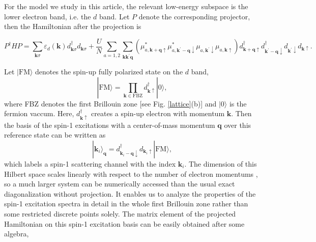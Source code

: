 \documentclass[amsmath,superscriptaddress,showpacs,aps,prb,twocolumn]{revtex4-1}
\begin{document}
\par For the model we study in this article, the relevant low-energy subspace is the lower electron band, i.e. the $d$ band. Let $P$ denote the corresponding projector, then the Hamiltonian after the projection is
\begin{widetext}
\begin{equation}
P^\dagger HP=\sum_{\mathbf{k}\sigma}\varepsilon_d(\mathbf{k})d^{\dagger}_{\mathbf{k}\sigma}d_{\mathbf{k}\sigma}
+\frac{U}{N}\sum_{a=1,2}\sum_{\mathbf{k}\mathbf{k}^{\prime}\mathbf{q}}
(\mu^{\ast}_{a,\mathbf{k}+\mathbf{q}\uparrow}\mu^{\ast}_{a,\mathbf{k}^{\prime}-\mathbf{q}\downarrow}\mu_{a,\mathbf{k}^{\prime}\downarrow}\mu_{a,\mathbf{k}\uparrow})
d^{\dagger}_{\mathbf{k}+\mathbf{q}\uparrow}d^{\dagger}_{\mathbf{k}^{\prime}-\mathbf{q}\downarrow}d_{\mathbf{k}^{\prime}\downarrow}d_{\mathbf{k}\uparrow}.
\end{equation}
\end{widetext}
Let $|\text{FM}\rangle$ denotes the spin-up fully polarized state on the $d$ band,
\begin{equation}
|\text{FM}\rangle=\prod_{\mathbf{k}\in \text{FBZ}}d^{\dagger}_{\mathbf{k}\uparrow}|\text{0}\rangle,
\end{equation}
where FBZ denotes the first Brillouin zone [see Fig. \ref{lattice}(b)] and $|0\rangle$ is the fermion vaccum. Here, $d^{\dag}_{\mathbf{k}\uparrow}$ creates a spin-up electron with momentum $\mathbf{k}$. Then the basis of the spin-1 excitations with a center-of-mass momentum $\mathbf{q}$ over this reference state can be written as
\begin{equation}
|\mathbf{k}_i\rangle_\mathbf{q}=d^{\dagger}_{\mathbf{k}_{i}-\mathbf{q}\downarrow}d_{\mathbf{k}_{i}\uparrow}|\text{FM}\rangle,
\end{equation}
which labels a spin-1 scattering channel with the index $\mathbf{k}_{i}$. The dimension of this Hilbert space scales linearly with respect to the number of electron momentums \cite{SGDL_PRB2018}, so a much larger system can be numerically accessed than the usual exact diagonalization without projection. It enables us to analyze the properties of the spin-1 excitation spectra in detail in the whole first Brillouin zone rather than some restricted discrete points solely. The matrix element of the projected Hamiltonian on this spin-1 excitation basis can be easily obtained after some algebra,
\end{document}
